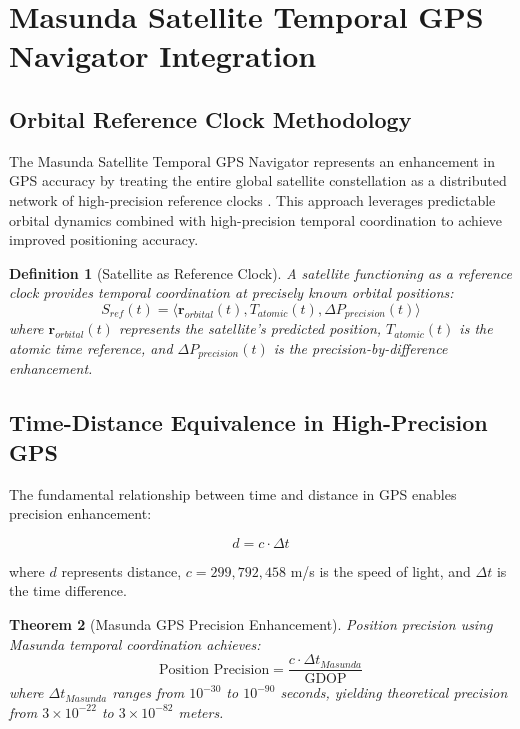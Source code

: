 \documentclass[12pt,a4paper]{article}
\newtheorem{theorem}{Theorem}[section]
\newtheorem{definition}[theorem]{Definition}
\begin{document}
\section{Masunda Satellite Temporal GPS Navigator Integration}

\subsection{Orbital Reference Clock Methodology}

The Masunda Satellite Temporal GPS Navigator represents an enhancement in GPS accuracy by treating the entire global satellite constellation as a distributed network of high-precision reference clocks \cite{masunda2025temporal}. This approach leverages predictable orbital dynamics combined with high-precision temporal coordination to achieve improved positioning accuracy.

\begin{definition}[Satellite as Reference Clock]
A satellite functioning as a reference clock provides temporal coordination at precisely known orbital positions:
\begin{equation}
S_{ref}(t) = \langle \mathbf{r}_{orbital}(t), T_{atomic}(t), \Delta P_{precision}(t) \rangle
\end{equation}
where $\mathbf{r}_{orbital}(t)$ represents the satellite's predicted position, $T_{atomic}(t)$ is the atomic time reference, and $\Delta P_{precision}(t)$ is the precision-by-difference enhancement.
\end{definition}

\subsection{Time-Distance Equivalence in High-Precision GPS}

The fundamental relationship between time and distance in GPS enables precision enhancement:

\begin{equation}
d = c \cdot \Delta t
\end{equation}

where $d$ represents distance, $c = 299,792,458$ m/s is the speed of light, and $\Delta t$ is the time difference.

\begin{theorem}[Masunda GPS Precision Enhancement]
Position precision using Masunda temporal coordination achieves:
\begin{equation}
\text{Position Precision} = \frac{c \cdot \Delta t_{Masunda}}{\text{GDOP}}
\end{equation}
where $\Delta t_{Masunda}$ ranges from $10^{-30}$ to $10^{-90}$ seconds, yielding theoretical precision from $3 \times 10^{-22}$ to $3 \times 10^{-82}$ meters.
\end{theorem}
\end{document}

